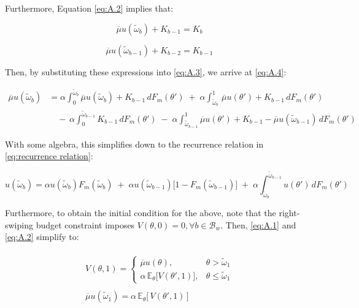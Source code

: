 Furthermore, Equation \ref{eq:A.2} implies that:

$$
\overline\mu u(\widetilde\omega_b) +K_{b-1}= K_b
$$

$$
\overline\mu u(\widetilde\omega_{b-1}) +K_{b-2}=K_{b-1}
$$

Then, by substituting these expressions into \ref{eq:A.3}, we arrive at \ref{eq:A.4}:

\begin{equation}\label{eq:A.4}
    \begin{split}
        \overline\mu u(\widetilde\omega_b) &=\alpha \int^{\widetilde\omega_b}_0 \overline\mu u(\widetilde\omega_b) +K_{b-1}\,dF_m(\theta') \;+\; \alpha \int^1_{\widetilde\omega_b} \,\overline\mu u(\theta') + K_{b-1}\,dF_m(\theta')\\ 
                                           & \quad -\,\alpha \int^{\widetilde\omega_{b-1}}_0 K_{b-1}\,dF_m(\theta') \;-\; \alpha \int^1_{\widetilde\omega_{b-1}} \overline\mu u(\theta') + K_{b-1}-\overline\mu u(\widetilde\omega_{b-1})\,dF_m(\theta')
    \end{split}
\end{equation}

With some algebra, this simplifies down to the recurrence relation in \autoref{eq:recurrence relation}: 

\begin{equation}
    u(\widetilde\omega_b)=\alpha   u(\widetilde\omega_b)F_m(\widetilde\omega_b) \;+\; \alpha  u(\widetilde\omega_{b-1})\Big[1  - F_m(\widetilde\omega_{b-1})\Big] \;+\; \alpha\int^{\widetilde\omega_{b-1}}_{\widetilde\omega_b} u(\theta') \,dF_m(\theta') 
\end{equation}

Furthermore, to obtain the initial condition for the above, note that the right-swiping budget constraint imposes $V(\theta,0)=0, \forall b\in \mathcal{B}_w$. Then, \ref{eq:A.1} and \ref{eq:A.2} simplify to:


\begin{align}
    \begin{split}\label{eq:A.5} 
        V(\theta, 1)=\begin{cases} 
            \overline\mu u(\theta),& \theta> \widetilde \omega_1 \\[6pt] 
            \alpha \,\mathbb{E}_{\theta}\Big[V(\theta', 1)\Big],& \theta\leq\widetilde \omega_1
        \end{cases}
    \end{split}\\[10pt]
    \begin{split}\label{eq:A.6}
        \overline\mu u(\widetilde\omega_1) = \alpha \, \mathbb{E}_\theta\Big[\,V(\theta',1)\,\Big] 
    \end{split} 
\end{align}

